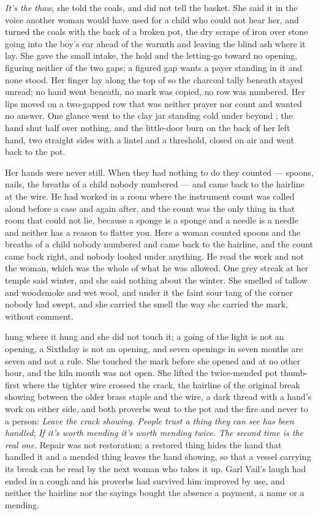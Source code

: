 \emph{It's the thaw}, she told the coals, and did not tell the basket. She said it in the voice another woman would have used for a child who could not hear her, and turned the coals with the back of a broken pot, the dry scrape of iron over stone going into the boy's ear ahead of the warmth and leaving the blind ash where it lay. She gave the small intake, the hold and the letting-go toward no opening, figuring neither of the two gaps; a figured gap wants a payer standing in it and none stood. Her finger lay along the top of  so the charcoal tally beneath stayed unread; no hand went beneath, no mark was copied, no row was numbered. Her lips moved on a two-gapped row that was neither prayer nor count and wanted no answer. One glance went to the clay jar standing cold under  beyond ; the hand shut half over nothing, and the little-door burn on the back of her left hand, two straight sides with a lintel and a threshold, closed on air and went back to the pot.

Her hands were never still. When they had nothing to do they counted --- spoons, nails, the breaths of a child nobody numbered --- and came back to the hairline at the wire. He had worked in a room where the instrument count was called aloud before a case and again after, and the count was the only thing in that room that could not lie, because a sponge is a sponge and a needle is a needle and neither has a reason to flatter you. Here a woman counted spoons and the breaths of a child nobody numbered and came back to the hairline, and the count came back right, and nobody looked under anything. He read the work and not the woman, which was the whole of what he was allowed. One grey streak at her temple said winter, and she said nothing about the winter. She smelled of tallow and woodsmoke and wet wool, and under it the faint sour tang of the corner nobody had swept, and she carried the smell the way she carried the mark, without comment.

 hung where it hung and she did not touch it; a going of the light is not an opening, a Sixthday is not an opening, and seven openings in seven months are seven and not a rule. She touched the mark before she opened  and at no other hour, and the kiln mouth was not open. She lifted the twice-mended pot thumb-first where the tighter wire crossed the crack, the hairline of the original break showing between the older brass staple and the wire, a dark thread with a hand's work on either side, and both proverbs went to the pot and the fire and never to a person: \emph{Leave the crack showing. People trust a thing they can see has been handled}; \emph{If it's worth mending it's worth mending twice. The second time is the real one}. Repair was not restoration; a restored thing hides the hand that handled it and a mended thing leaves the hand showing, so that a vessel carrying its break can be read by the next woman who takes it up. Garl Vail's laugh had ended in a cough and his proverbs had survived him improved by use, and neither the hairline nor the sayings bought the absence a payment, a name or a mending.

